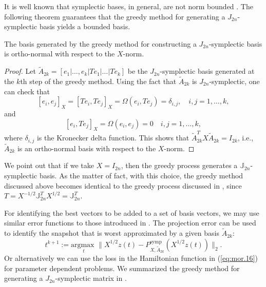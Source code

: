 It is well known that symplectic bases, in general, are not norm bounded \cite{doi:10.1137/050628519}. The following theorem guarantees that the greedy method for generating a $J_{2n}$-symplectic basis yields a bounded basis.
\begin{theorem}
The basis generated by the greedy method for constructing a $J_{2n}$-symplectic basis is ortho-normal with respect to the $X$-norm.
\end{theorem}
\begin{proof}
Let $\tilde A_{2k}=[e_1|\dots,e_k|Te_1|\dots|Te_k]$ be the $J_{2n}$-symplectic basis generated at the $k$th step of the greedy method. Using the fact that $\tilde A_{2k}$ is $J_{2n}$-symplectic, one can check that
\begin{equation} \label{eq:normmor.12}
	[e_i,e_j]_X = [Te_i,Te_j]_X = \Omega(e_i,Te_j)=\delta_{i,j}, \quad i,j=1,\dots,k,	
\end{equation}
and
\begin{equation} \label{eq:normmor.13}
	[e_i,Te_j]_X = \Omega(e_i,e_j) = 0\quad i,j=1,\dots,k,
\end{equation}
where $\delta_{i,j}$ is the Kronecker delta function. This shows that $\tilde A_{2k}^TX\tilde A_{2k} = I_{2k}$, i.e., $\tilde A_{2k}$ is an ortho-normal basis with respect to the $X$-norm.
\end{proof}
We point out that if we take $X=I_{2n}$, then the greedy process generates a $\mathbb J_{2n}$- symplectic basis. As the matter of fact, with this choice, the greedy method discussed above becomes identical to the greedy process discussed in , since $T = X^{-1/2}\mathbb J_{2n}^TX^{1/2} = \mathbb J_{2n}^T$.

For identifying the best vectors to be added to a set of basis vectors, we may use similar error functions to those introduced in . The projection error can be used to identify the snapshot that is worst approximated by a given basis $\tilde A_{2k}$:
\begin{equation} \label{eq:normmor.14}
	t^{k+1} := \underset{t}{\text{argmax } }\| X^{1/2}z(t) - P^\text{symp}_{X,\tilde A_{2k}}(X^{1/2}z(t)) \|_2. 
\end{equation}
Or alternatively we can use the loss in the Hamiltonian function in (\ref{eq:mor.16}) for parameter dependent problems. We summarized the greedy method for generating a $J_{2n}$-symplectic matrix in .

